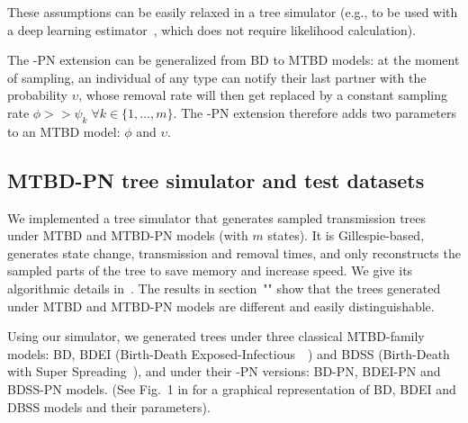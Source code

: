 \documentclass[10pt,letterpaper]{article}
\begin{document}
These assumptions can be easily relaxed in a tree simulator (e.g., to be used with a deep learning estimator~\cite{Voznica2021}, which does not require likelihood calculation).


The -PN extension can be generalized from BD to MTBD models: at the moment of sampling, an individual of any type can notify their last partner with the probability $\upsilon$, whose removal rate will then get replaced by  a constant sampling rate $\phi >> \psi_k \; \forall k \in \{1, \ldots, m\}$. The -PN extension therefore adds two parameters to an MTBD model: $\phi$ and $\upsilon$.

\subsection*{MTBD-PN tree simulator and test datasets}\label{sec:sim}

We implemented a tree simulator that generates sampled transmission trees under MTBD and MTBD-PN models (with $m$ states). It is Gillespie-based, generates state change, transmission and removal times, and only reconstructs the sampled parts of the tree to save memory and increase speed.
We give its algorithmic details in~. The results in section~"" show that the trees generated under MTBD and MTBD-PN models are different and easily distinguishable.

Using our simulator, we generated trees under three classical MTBD-family models: BD, BDEI (Birth-Death Exposed-Infectious~~\cite{Stadler2014}) and BDSS (Birth-Death with Super Spreading~\cite{Stadler2013a}), and under their -PN versions: BD-PN, BDEI-PN and BDSS-PN models. (See Fig.~1 in \cite{Voznica2021} for a graphical representation of BD, BDEI and DBSS models and their parameters).
\end{document}
